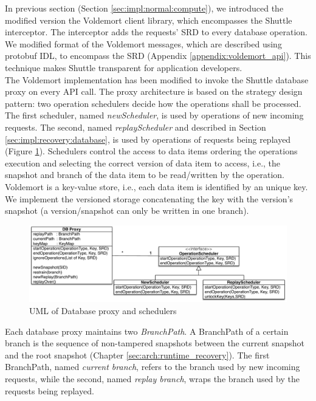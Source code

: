 In previous section (Section \ref{sec:impl:normal:compute}), we introduced the modified version the Voldemort client library, which encompasses the Shuttle interceptor. The interceptor adds the requests' \ac{SRD} to every database operation. We modified format of the Voldemort messages, which are described using \acf{protobuf} \acs{IDL}, to encompass the \ac{SRD} (Appendix \ref{appendix:voldemort_api}). This technique makes Shuttle transparent for application developers.\\


The Voldemort implementation has been modified to invoke the Shuttle database proxy on every \ac{API} call. The proxy architecture is based on the strategy design pattern: two operation schedulers decide how the operations shall be processed. The first scheduler, named \emph{newScheduler}, is used by operations of new incoming requests. The second, named \emph{replayScheduler} and described in Section \ref{sec:impl:recovery:database}, is used by operations of requests being replayed (Figure \ref{fig:scheduler_uml}). Schedulers control the access to data items ordering the operations execution and selecting the correct version of data item to access, i.e., the snapshot and branch of the data item to be read/written by the operation. Voldemort is a key-value store, i.e., each data item is identified by an unique key. We implement the versioned storage concatenating the key with the version's snapshot (a version/snapshot can only be written in one branch).\\

\begin{figure}
  \centering
  \includegraphics[width=\textwidth]{arch/scheduler_uml}
  \caption{UML of Database proxy and schedulers}
  \label{fig:scheduler_uml}
\end{figure}

Each database proxy maintains two \emph{BranchPath}. A BranchPath of a certain branch is the sequence of non-tampered snapshots between the current snapshot and the root snapshot (Chapter \ref{sec:arch:runtime_recovery}). The first BranchPath, named \textit{current branch}, refers to the branch used by new incoming requests, while the second, named \textit{replay branch}, wraps the branch used by the requests being replayed.

